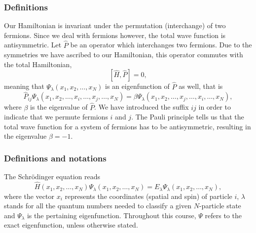 \frame
{
\frametitle{Definitions}
Our Hamiltonian is invariant under the permutation (interchange) of two fermions.
Since we deal with fermions however, the total wave function is antisymmetric.
Let $\hat{P}$ be an operator which interchanges two fermions.
Due to the symmetries we have ascribed to our Hamiltonian, this operator commutes with the total Hamiltonian,
\[
[\hat{H},\hat{P}] = 0,
\]
meaning that $\Psi_{\lambda}(x_1, x_2, \dots , x_N)$ is an eigenfunction of 
$\hat{P}$ as well, that is
\[
\hat{P}_{ij}\Psi_{\lambda}(x_1, x_2, \dots,x_i,\dots,x_j,\dots,x_N)=
\beta\Psi_{\lambda}(x_1, x_2, \dots,x_j,\dots,x_i,\dots,x_N),
\]
where $\beta$ is the eigenvalue of $\hat{P}$. We have introduced the suffix $ij$ in order to indicate that we permute fermions $i$ and $j$.
The Pauli principle tells us that the total wave function for a system of fermions
has to be antisymmetric, resulting in the eigenvalue $\beta = -1$.   

}

\frame
{
  \frametitle{Definitions and notations}
\begin{small}
{\scriptsize
The Schr\"odinger equation reads 
\begin{equation}
\hat{H}(x_1, x_2, \dots , x_N) \Psi_{\lambda}(x_1, x_2, \dots , x_N) = 
E_\lambda  \Psi_\lambda(x_1, x_2, \dots , x_N), 
\label{eq:basicSE1}
\end{equation}
where the vector $x_i$ represents the coordinates (spatial and spin) of particle $i$, $\lambda$ stands  for all the quantum
numbers needed to classify a given $N$-particle  state and $\Psi_{\lambda}$ is the pertaining eigenfunction.  Throughout this course,
$\Psi$ refers to the exact eigenfunction, unless otherwise stated.
}
\end{small}
}

